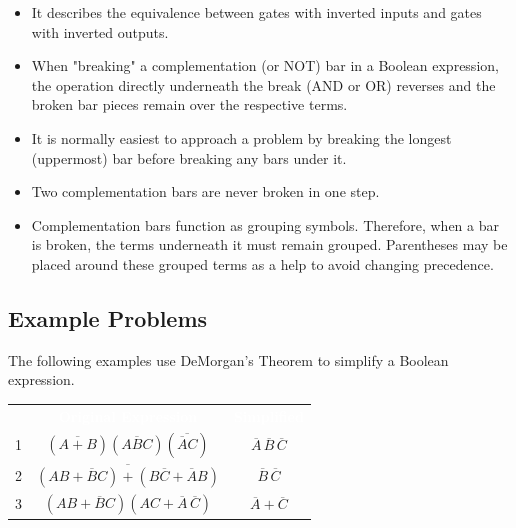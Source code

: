 \begin{itemize}
  \item It describes the equivalence between gates with inverted inputs and gates with inverted outputs. 
  \item When "breaking" a complementation (or \textsf{NOT}) bar in a Boolean expression, the operation directly underneath the break (\textsf{AND} or \textsf{OR}) reverses and the broken bar pieces remain over the respective terms. 
  \item It is normally easiest to approach a problem by breaking the longest (uppermost) bar before breaking any bars under it. 
  \item Two complementation bars are never broken in one step. 
  \item Complementation bars function as grouping symbols. Therefore, when a bar is broken, the terms underneath it must remain grouped. Parentheses may be placed around these grouped terms as a help to avoid changing precedence.
\end{itemize}

\subsection{Example Problems}
\label{BF:subsec:demorgans_example_problems}

The following examples use DeMorgan's Theorem to simplify a Boolean expression.

\begin{table}[H]
  \newcommand{\head}[1]{\textcolor{white}{\textbf{#1}}}    
  \begin{center}
    \begin{tabular}{c|cc} 
      \rowcolor{black!75}
      & \head{Original Expression} & \head{Simplified} \\
      1 & $ (\overline{A+B})(\overline{ABC})(\overline{\overline{A}C}) $ 
        & $ \overline{A}\,\overline{B}\,\overline{C} $ \\
      2 & $ \overline{(AB+\overline{B}C)+(B\overline{C}+\overline{A}B)} $ 
        & $ \overline{B}\,\overline{C} $ \\
      3 & $ (AB+\overline{B}C)(AC+\overline{A}\,\overline{C}) $ 
        & $ \overline{A}+\overline{C} $ 
    \end{tabular}
  \end{center}
  \label{BF:tab:demorgans_example_problems}
  \sffamily
\end{table}


